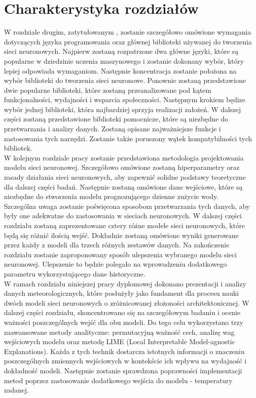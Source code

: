 \documentclass[a4paper,twoside,12pt]{book}
\begin{document}
\section{Charakterystyka rozdziałów}


W rozdziale drugim, zatytułowanym , zostanie szczegółowo omówione wymagania dotyczących języka programowania oraz głównej biblioteki używanej do tworzenia sieci neuronowych. Najpierw zostaną rozpatrzone dwa główne języki, które są popularne w dziedzinie uczenia maszynowego i zostanie dokonany wybór, który lepiej odpowiada wymaganiom. Następnie koncentracja zostanie położona na wybór biblioteki do tworzenia sieci neuronowe. Ponownie zostaną przedstawione dwie popularne biblioteki, które zostaną przeanalizowane pod kątem funkcjonalności, wydajności i wsparcia społeczności. Następnym krokiem będize wybór jednej biblioteki, która najbardziej sprzyja realizacji założeń. W dalszej części zostaną przedstawione biblioteki pomocnicze, które są niezbędne do przetwarzania i analizy danych. Zostaną opisane najważniejsze funkcje i zastosowania tych narzędzi. Zostanie także poruszony wątek kompatybilności tych bibliotek.\\

W kolejnym rozdziale pracy zostanie przedstawiona metodologia projektowania modelu sieci neuronowej. Szczegółowo omówione zostaną hiperparametry oraz zasady działania sieci neuronowych, aby zapewnić solidne podstawy teoretyczne dla dalszej części badań. Następnie zostaną omówione dane wejściowe, które są niezbędne do stworzenia modelu prognozującego dzienne zużycie wody. Szczególna uwaga zostanie poświęcona sposobom przetwarzania tych danych, aby były one adekwatne do zastosowania w sieciach neuronowych. W dalszej części rozdziału zostaną zaprezentowane cztery różne modele sieci neuronowych, które będą się różnić ilością wejść. Dokładnie zostaną omówione wyniki generowane przez każdy z modeli dla trzech różnych zestawów danych. Na zakończenie rozdziału zostanie zaproponowany sposób ulepszenia wybranego modelu sieci neuronowej. Ulepszenie to będzie polegało na wprowadzeniu dodatkowego parametru wykorzystującego dane historyczne.\\

W ramach rozdziału  niniejszej pracy dyplomowej dokonano prezentacji i analizy danych meteorologicznych, które posłużyły jako fundament dla procesu nauki dwóch modeli sieci neuronowych o zróżnicowanej złożoności architektonicznej. W dalszej części rozdziału, skoncentrowano się na szczegółowym badaniu i ocenie ważności poszczególnych wejść dla obu modeli. Do tego celu wykorzystano trzy zaawansowane metody analityczne: permutacyjną ważność cech, analizę wag wejściowych modelu oraz metodę LIME (Local Interpretable Model-agnostic Explanations). Każda z tych technik dostarcza istotnych informacji o znaczeniu poszczególnych zmiennych wejściowych w kontekście ich wpływu na wydajność i dokładność modeli. Następnie zostanie sprawdzona poprawności implementacji metod poprzez zastosowanie dodatkowego wejścia do modelu - temperatury zadanej.\\
\end{document}
